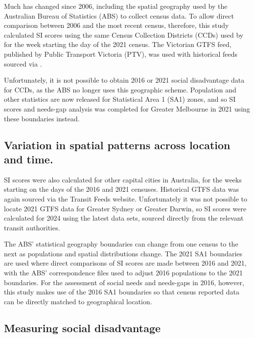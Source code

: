 \documentclass[preprint, 3p,
authoryear]{elsarticle} %
\begin{document}
Much has changed since 2006, including the spatial geography used by the
Australian Bureau of Statistics (ABS) to collect census data. To allow
direct comparison between 2006 and the most recent census, therefore,
this study calculated SI scores using the same Census Collection
Districts (CCDs) used by \citet{currie2010identifying} for the week
starting the day of the 2021 census. The Victorian GTFS feed, published
by Public Transport Victoria (PTV), was used with historical feeds
sourced via \citet{transitfeeds_victoria:2023aa}.

Unfortunately, it is not possible to obtain 2016 or 2021 social
disadvantage data for CCDs, as the ABS no longer uses this geographic
scheme. Population and other statistics are now released for Statistical
Area 1 (SA1) zones, and so SI scores and needs-gap analysis was
completed for Greater Melbourne in 2021 using these boundaries instead.

\subsection{Variation in spatial patterns across location and
time.}\label{variation-in-spatial-patterns-across-location-and-time.}

SI scores were also calculated for other capital cities in Australia,
for the weeks starting on the days of the 2016 and 2021 censuses.
Historical GTFS data was again sourced via the Transit Feeds website.
Unfortunately it was not possible to locate 2021 GTFS data for Greater
Sydney or Greater Darwin, so SI scores were calculated for 2024 using
the latest data sets, sourced directly from the relevant transit
authorities.

The ABS' statistical geography boundaries can change from one census to
the next as populations and spatial distributions change. The 2021 SA1
boundaries are used where direct comparisons of SI scores are made
between 2016 and 2021, with the ABS' correspondence files used to adjust
2016 populations to the 2021 boundaries. For the assessment of social
needs and needs-gaps in 2016, however, this study makes use of the 2016
SA1 boundaries so that census reported data can be directly matched to
geographical location.

\subsection{Measuring social
disadvantage}\label{measuring-social-disadvantage}
\end{document}
